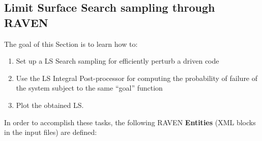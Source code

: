 \subsection{Limit Surface Search sampling through RAVEN}
\label{sub:LSsamplingExample}
The goal of this Section is to learn how to:
 \begin{enumerate}
   \item Set up a LS Search sampling for efficiently perturb a driven code
   \item Use the LS Integral Post-processor for computing the probability of failure of the system subject to the same
   ``goal'' function
   \item Plot the obtained LS.
\end{enumerate}
In order to accomplish these tasks, the following RAVEN \textbf{Entities} (XML blocks in the input files) are defined:
